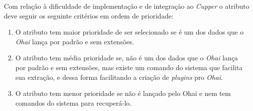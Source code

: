 Com relação à dificuldade de implementação e de integração ao \textit{Cupper} o
atributo deve seguir os seguinte critérios em ordem de prioridade:

\begin{enumerate}
\item O atributo tem maior prioridade de ser selecionado se é um dos dados 
que o \textit{Ohai} lança por padrão e sem extensões.
\item O atributo tem média prioridade se, não é um dos dados que o \textit{Ohai}
lança por padrão e sem extensões, mas existe um comando do sistema que facilita 
sua extração, e dessa forma facilitando a criação de \textit{plugins} pro 
\textit{Ohai}.
\item O atributo tem menor prioridade se não é lançado pelo Ohai e nem tem 
comandos do sistema para recuperá-lo.
\end{enumerate}

